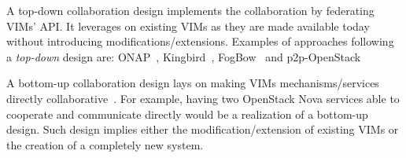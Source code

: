 A top-down collaboration design implements the collaboration by
federating VIMs' API. It leverages on existing VIMs as they are made
available today without introducing modifications/extensions. Examples
of approaches following a \emph{top-down} design are:
ONAP~\cite{onap}, Kingbird~\cite{kingbird},
FogBow~\cite{brasileiro2016fogbow} and
p2p-OpenStack~\cite{ericsson-p2p}

A bottom-up collaboration design lays on making VIMs
mechanisms/services directly collaborative~\cite{7923796}. For example, having two
OpenStack Nova services able to cooperate and communicate directly
would be a realization of a bottom-up design. Such design implies
either the modification/extension of existing VIMs or the creation of
a completely new system.
